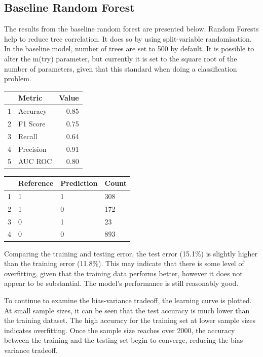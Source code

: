 \documentclass[11pt,preprint, authoryear]{elsarticle}
\let\origtable\table
\let\endorigtable\endtable
\renewenvironment{table}[1][2] {
    \expandafter\origtable\expandafter[H]
} {
    \endorigtable
}
\numberwithin{equation}{section}
\numberwithin{figure}{section}
\numberwithin{table}{section}
\begin{document}
\hypertarget{baseline-random-forest}{%
\subsection{Baseline Random Forest}\label{baseline-random-forest}}

The results from the baseline random forest are presented below. Random
Forests help to reduce tree correlation. It does so by using
split-variable randomisation. In the baseline model, number of trees are
set to 500 by default. It is possible to alter the m(try) parameter, but
currently it is set to the square root of the number of parameters,
given that this standard when doing a classification problem.

\begin{table}[H]
\centering
\begin{tabular}{rlr}
  \hline
 & Metric & Value \\ 
  \hline
1 & Accuracy & 0.85 \\ 
  2 & F1 Score & 0.75 \\ 
  3 & Recall & 0.64 \\ 
  4 & Precision & 0.91 \\ 
  5 & AUC ROC & 0.80 \\ 
   \hline
\end{tabular}
\caption{Metrics for Baseline Random Forest \label{tab1}} 
\end{table}

\begin{table}[H]
\centering
\begin{tabular}{rlll}
  \hline
 & Reference & Prediction & Count \\ 
  \hline
1 & 1 & 1 & 308 \\ 
  2 & 1 & 0 & 172 \\ 
  3 & 0 & 1 &  23 \\ 
  4 & 0 & 0 & 893 \\ 
   \hline
\end{tabular}
\caption{Confusion Matrix for Baseline Random Forest \label{tab1}} 
\end{table}

Comparing the training and testing error, the test error (15.1\%) is
slightly higher than the training error (11.8\%). This may indicate that
there is some level of overfitting, given that the training data
performs better, however it does not appear to be substantial. The
model's performance is still reasonably good.

To continue to examine the bias-variance tradeoff, the learning curve is
plotted. At small sample sizes, it can be seen that the test accuracy is
much lower than the training dataset. The high accuracy for the training
set at lower sample sizes indicates overfitting. Once the sample size
reaches over 2000, the accuracy between the training and the testing set
begin to converge, reducing the bias-variance tradeoff.
\end{document}
